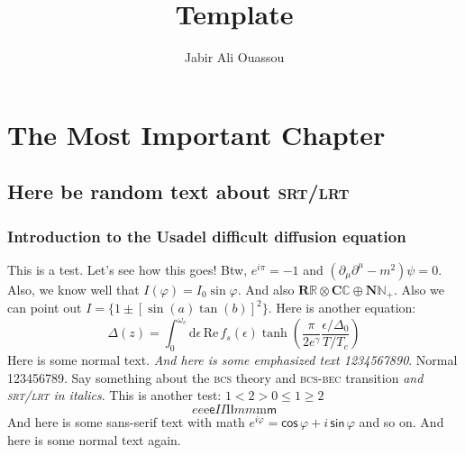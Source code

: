 \documentclass[b5paper]{scrbook}
\title{Template}
\author{Jabir Ali Ouassou}
\begin{document}
\maketitle %
\frontmatter
\tableofcontents
\mainmatter 


\chapter{The Most Important Chapter}
\section{Here be random text about \textsc{srt/lrt}}
\subsection{Introduction to the Usadel difficult diffusion equation}
This is a test. Let's see how this goes! Btw, $e^{i\pi} = -1$ and $(\partial_\mu \partial^\mu - m^2) \psi = 0$.
Also, we know well that $I(\varphi) = I_0 \sin \varphi$.  And also $\mathbf{R}\mathbb{R} \otimes \mathbf{C}\mathbb{C} \oplus \mathbf{N}\mathbb{N}_+$.
Also we can point out $I = \{ 1 \pm [\sin(a)\tan(b)]^2\} $.
Here is another equation:
\begin{equation}
  \Delta(z) = \int_0^{\omega_c} \mathrm{d}\epsilon\,\mathrm{Re}\, f_s(\epsilon) \tanh\!\left(\frac{\pi}{2e^\gamma} \frac{\epsilon/\Delta_0}{T/T_c}\right)
\end{equation}
Here is some normal text. \textit{And here is some emphasized text 1234567890}. Normal 123456789. 
Say something about the \textsc{bcs} theory and \textsc{bcs-bec} transition \emph{and \textsc{srt/lrt} in italics}.
This is another test: $1 < 2 > 0 \leq 1 \geq 2$
\begin{equation}
  \textit{e}e\mathrm{e}\textsf{e}%
  \textit{I}I\mathrm{I}\textsf{I}%
  \textit{m}m\mathrm{m}\textsf{m}%
\end{equation}
\textsf{And here is some sans-serif text with math $e^{i\varphi}=\textsf{cos}\,\varphi+i\,\textsf{sin}\,\varphi$ and so on.} And here is some normal text again.
\end{document}
